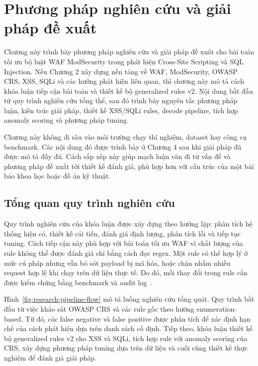 \chapter{Phương pháp nghiên cứu và giải pháp đề xuất}
\label{chap:method-solution}

Chương này trình bày phương pháp nghiên cứu và giải pháp đề xuất cho bài toán tối ưu bộ luật WAF ModSecurity trong phát hiện Cross-Site Scripting và SQL Injection. Nếu Chương 2 xây dựng nền tảng về WAF, ModSecurity, OWASP CRS, XSS, SQLi và các hướng phát hiện liên quan, thì chương này mô tả cách khóa luận tiếp cận bài toán và thiết kế bộ generalized rules v2. Nội dung bắt đầu từ quy trình nghiên cứu tổng thể, sau đó trình bày nguyên tắc phương pháp luận, kiến trúc giải pháp, thiết kế XSS/SQLi rules, decode pipeline, tích hợp anomaly scoring và phương pháp tuning.

Chương này không đi sâu vào môi trường chạy thí nghiệm, dataset hay công cụ benchmark. Các nội dung đó được trình bày ở Chương 4 sau khi giải pháp đã được mô tả đầy đủ. Cách sắp xếp này giúp mạch luận văn đi từ vấn đề và phương pháp đề xuất tới thiết kế đánh giá, phù hợp hơn với cấu trúc của một bài báo khoa học hoặc đồ án kỹ thuật.

\section{Tổng quan quy trình nghiên cứu}
\label{sec:research-workflow}

Quy trình nghiên cứu của khóa luận được xây dựng theo hướng lặp: phân tích hệ thống hiện có, thiết kế cải tiến, đánh giá định lượng, phân tích lỗi và tiếp tục tuning. Cách tiếp cận này phù hợp với bài toán tối ưu WAF vì chất lượng của rule không thể được đánh giá chỉ bằng cách đọc regex. Một rule có thể hợp lý ở mức cú pháp nhưng vẫn bỏ sót payload bị mã hóa, hoặc chặn nhầm nhiều request hợp lệ khi chạy trên dữ liệu thực tế. Do đó, mỗi thay đổi trong rule cần được kiểm chứng bằng benchmark và audit log~\cite{benchmark-methodology,waf-tuning-methodology}.

Hình~\ref{fig:research-pipeline-flow} mô tả luồng nghiên cứu tổng quát. Quy trình bắt đầu từ việc khảo sát OWASP CRS và các rule gốc theo hướng enumeration-based. Từ đó, các false negative và false positive được phân tích để xác định hạn chế của cách phát hiện dựa trên danh sách cố định. Tiếp theo, khóa luận thiết kế bộ generalized rules v2 cho XSS và SQLi, tích hợp rule với anomaly scoring của CRS, xây dựng phương pháp tuning dựa trên dữ liệu và cuối cùng thiết kế thực nghiệm để đánh giá giải pháp.

